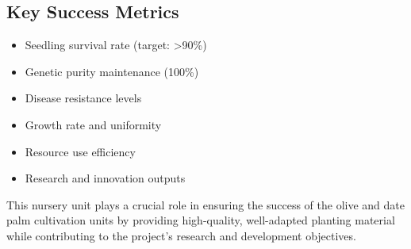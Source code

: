 \subsection{Key Success Metrics}
\begin{itemize}
    \item Seedling survival rate (target: >90\%)
    \item Genetic purity maintenance (100\%)
    \item Disease resistance levels
    \item Growth rate and uniformity
    \item Resource use efficiency
    \item Research and innovation outputs
\end{itemize}

This nursery unit plays a crucial role in ensuring the success of the olive and date palm cultivation units by providing high-quality, well-adapted planting material while contributing to the project's research and development objectives. 